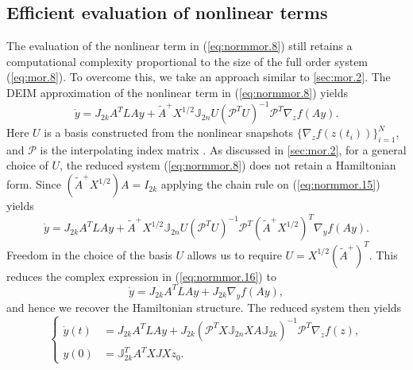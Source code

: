 \subsection{Efficient evaluation of nonlinear terms} \label{sec:normmor.3}
The evaluation of the nonlinear term in (\ref{eq:normmor.8}) still retains a computational complexity proportional to the size of the full order system (\ref{eq:mor.8}). To overcome this, we take an approach similar to \cref{sec:mor.2}. The DEIM approximation of the nonlinear term in (\ref{eq:normmor.8}) yields
\begin{equation} \label{eq:normmor.15}
	\dot y = J_{2k} A^TLAy + \tilde A ^+ X^{1/2} \mathbb J_{2n} U (\mathcal P^TU)^{-1}\mathcal  P^T \nabla_z f(Ay).
\end{equation}
Here $U$ is a basis constructed from the nonlinear snapshots $\{\nabla_z f(z(t_i))\}_{i=1}^N$, and $\mathcal P$ is the interpolating index matrix \cite{Chaturantabut:2010cz}. As discussed in \cref{sec:mor.2}, for a general choice of $U$, the reduced system (\ref{eq:normmor.8}) does not retain a Hamiltonian form. Since $(\tilde A^+ X^{1/2}) A = I_{2k}$ applying the chain rule on (\ref{eq:normmor.15}) yields
\begin{equation} \label{eq:normmor.16}
	\dot y = J_{2k} A^TLAy + \tilde A ^+ X^{1/2} \mathbb J_{2n} U (\mathcal P^TU)^{-1} \mathcal P^T (\tilde A^+ X^{1/2})^T \nabla_y f(Ay).
\end{equation}
Freedom in the choice of the basis $U$ allows us to require $U = X^{1/2} (\tilde A^+)^T$. This reduces the complex expression in (\ref{eq:normmor.16}) to
\begin{equation} \label{eq:normmor.17}
	\dot y = J_{2k} A^TLAy + J_{2k} \nabla_y f(Ay),
\end{equation}
and hence we recover the Hamiltonian structure. The reduced system then yields
\begin{equation} \label{eq:normmor.18}
\left\{
\begin{aligned}
	\dot y(t) &= J_{2k} A^TLAy + J_{2k} (\mathcal P^TX \mathbb J_{2n} X A \mathbb J_{2k})^{-1} \mathcal P^T \nabla_z f(z), \\
	y(0) &= \mathbb J_{2k}^T A^T X J X z_0.
\end{aligned}
\right.
\end{equation}
